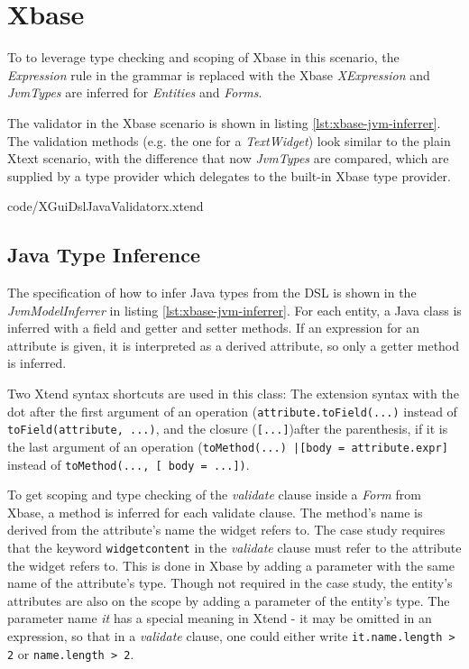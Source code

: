 \section{Xbase}
To to leverage type checking and scoping of Xbase in this scenario, the \emph{Expression} rule in the grammar is replaced with the Xbase \emph{XExpression} and \emph{JvmTypes} are inferred for \emph{Entities} and \emph{Forms}.

The validator in the Xbase scenario is shown in listing \ref{lst:xbase-jvm-inferrer}. The validation methods (e.g. the one for a \emph{TextWidget}) look similar to the plain Xtext scenario, with the difference that now \emph{JvmTypes} are compared, which are supplied by a type provider which delegates to the built-in Xbase type provider.

	{code/XGuiDslJavaValidatorx.xtend}

\subsection{Java Type Inference}
The specification of how to infer Java types from the DSL is shown in the \emph{JvmModelInferrer} in listing \ref{lst:xbase-jvm-inferrer}.  For each entity, a Java class is inferred with a field and getter and setter methods. If an expression for an attribute is given, it is interpreted as a derived attribute, so only a getter method is inferred. 

Two Xtend syntax shortcuts are used in this class: The extension syntax with the dot after the first argument of an operation (\verb|attribute.toField(...)| instead of \verb|toField(attribute, ...)|, and the closure (\verb|[...]|)after the parenthesis, if it is the last argument of an operation (\lstinline[basicstyle=\ttfamily]{toMethod(...) |[body = attribute.expr]} instead of \lstinline[basicstyle=\ttfamily]{toMethod(..., [ body = ...])}.

To get scoping and type checking of the \emph{validate} clause inside a \emph{Form} from Xbase, a method is inferred for each validate clause. The method's name is derived from the attribute's name the widget refers to. The case study requires that the keyword \verb|widgetcontent| in the \emph{validate} clause must refer to the attribute the widget refers to. This is done in Xbase by adding a parameter with the same name of the attribute's type. Though not required in the case study, the entity's attributes are also on the scope by adding a parameter of the entity's type. The parameter name \emph{it} has a special meaning in Xtend - it may be omitted in an expression, so that in a \emph{validate} clause, one could either write \lstinline[basicstyle=\ttfamily]{it.name.length > 2} or \verb|name.length > 2|.

